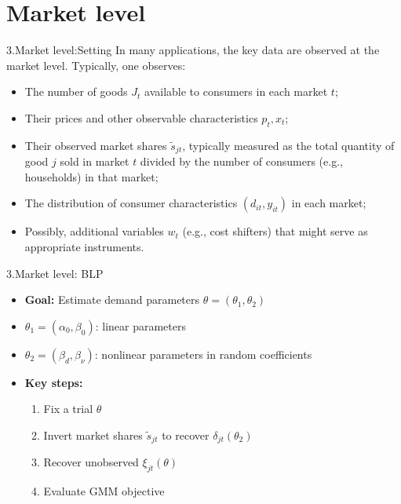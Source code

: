 \documentclass[aspectratio=169]{beamer}  %
\begin{document}
\section{Market level}
\begin{frame}{3.Market level:Setting}
In many applications, the key data are observed at the market level. Typically, one observes:
\begin{itemize}
    \item The number of goods \( J_t \) available to consumers in each market \( t \);
    \item Their prices and other observable characteristics \( p_t, x_t \);
    \item Their observed market shares \( \tilde{s}_{jt} \), typically measured as the total quantity of good \( j \) sold in market \( t \) divided by the number of consumers (e.g., households) in that market;
    \item The distribution of consumer characteristics \( (d_{it}, y_{it}) \) in each market;
    \item Possibly, additional variables \( w_t \) (e.g., cost shifters) that might serve as appropriate instruments.
\end{itemize}
\end{frame}

\begin{frame}{3.Market level: BLP}
    \begin{itemize}
        \item \textbf{Goal:} Estimate demand parameters \( \theta = (\theta_1, \theta_2) \)
        \item \( \theta_1 = (\alpha_0, \beta_0) \): linear parameters
        \item \( \theta_2 = (\beta_d, \beta_\nu) \): nonlinear parameters in random coefficients
        \item \textbf{Key steps:}
        \begin{enumerate}
            \item Fix a trial \( \theta \)
            \item Invert market shares \( \tilde{s}_{jt} \) to recover \( \delta_{jt}(\theta_2) \)
            \item Recover unobserved \( \xi_{jt}(\theta) \)
            \item Evaluate GMM objective
        \end{enumerate}
    \end{itemize}
\end{frame}
\end{document}
